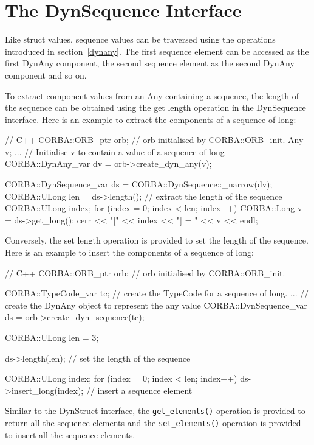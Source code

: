 \documentclass[11pt,twoside,a4paper]{book}
\newcommand{\op}[1]{\texttt{#1()}}
\begin{document}
\section{The DynSequence Interface}

Like struct values, sequence values can be traversed using the
operations introduced in section~\ref{dynany}. The first sequence
element can be accessed as the first DynAny component, the second
sequence element as the second DynAny component and so on.

To extract component values from an Any containing a sequence, the
length of the sequence can be obtained using the get length operation
in the DynSequence interface. Here is an example to extract the
components of a sequence of long:

\begin{cxxlisting}
// C++
CORBA::ORB_ptr orb;  // orb initialised by CORBA::ORB_init.
Any v;
...       // Initialise v to contain a value of a sequence of long
CORBA::DynAny_var dv = orb->create_dyn_any(v);
  
CORBA::DynSequence_var ds = CORBA::DynSequence::_narrow(dv);
CORBA::ULong len = ds->length();     // extract the length of the sequence
CORBA::ULong index;
for (index = 0; index < len; index++) {
  CORBA::Long v = ds->get_long();
  cerr << "[" << index << "] = " << v << endl;
}
\end{cxxlisting}

Conversely, the set length operation is provided to set the length of
the sequence. Here is an example to insert the components of a
sequence of long:

\begin{cxxlisting}
// C++
CORBA::ORB_ptr orb;  // orb initialised by CORBA::ORB_init.
  
CORBA::TypeCode_var tc;
// create the TypeCode for a sequence of long.
...
// create the DynAny object to represent the any value
CORBA::DynSequence_var ds = orb->create_dyn_sequence(tc);
  
CORBA::ULong len = 3;
  
ds->length(len);             // set the length of the sequence
  
CORBA::ULong index;
for (index = 0; index < len; index++) {
  ds->insert_long(index);    // insert a sequence element
}
\end{cxxlisting}

Similar to the DynStruct interface, the \op{get\_elements} operation
is provided to return all the sequence elements and the
\op{set\_elements} operation is provided to insert all the sequence
elements.
\end{document}
